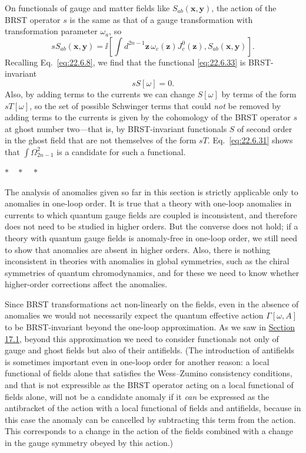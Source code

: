 On functionals of gauge and matter fields like
$S_{ab}(\mathbf x,\mathbf y)$, the action of the BRST operator $s$
is the same as that of a gauge transformation with transformation
parameter $\omega_a$, so
\[
 sS_{ab}(\mathbf x,\mathbf y)
 =\ii\left[
 \int d^{2n-1}\mathbf z\,\omega_c(\mathbf z)J^0_c(\mathbf z),
 S_{ab}(\mathbf x,\mathbf y)
 \right].
\]
Recalling Eq.~\eqref{eq:22.6.8}, we find that the functional
\eqref{eq:22.6.33} is BRST-invariant
\begin{equation}
 sS[\omega]=0.
 \tag{22.6.34}\label{eq:22.6.34}
\end{equation}
Also, by adding terms to the currents we can change $S[\omega]$ by terms
of the form $sT[\omega]$, so the set of possible Schwinger terms that
could \emph{not} be removed by adding terms to the currents is given by
the cohomology of the BRST operator $s$ at ghost number two---that is, by
BRST-invariant functionals $S$ of second order in the ghost field that are
not themselves of the form $sT$. Eq.~\eqref{eq:22.6.31} shows that
$\int\Omega^2_{2n-1}$ is a candidate for such a functional.

\begin{center}
$* \quad * \quad *$
\end{center}

The analysis of anomalies given so far in this section is strictly
applicable only to anomalies in one-loop order. It is true that a theory
with one-loop anomalies in currents to which quantum gauge fields are
coupled is inconsistent, and therefore does not need to be studied in
higher orders. But the converse does not hold; if a theory with quantum
gauge fields is anomaly-free in one-loop order, we still need to show that
anomalies are absent in higher orders. Also, there is nothing inconsistent
in theories with anomalies in global symmetries, such as the chiral
symmetries of quantum chromodynamics, and for these we need to know
whether higher-order corrections affect the anomalies.

Since BRST transformations act non-linearly on the fields, even in the
absence of anomalies we would not necessarily expect the quantum
effective action $\Gamma[\omega,A]$ to be BRST-invariant beyond the
one-loop approximation. As we saw in
\hyperref[sec:17.1]{Section 17.1}, beyond this approximation we need to
consider functionals not only of gauge and ghost fields but also of their
antifields. (The introduction of antifields is sometimes important even in
one-loop order for another reason: a local functional of fields alone that
satisfies the Wess--Zumino consistency conditions, and that is not
expressible as the BRST operator acting on a local functional of fields
alone, will not be a candidate anomaly if it \emph{can} be expressed as the
antibracket of the action with a local functional of fields and antifields,
because in this case the anomaly can be cancelled by subtracting this term
from the action. This corresponds to a change in the action of the fields
combined with a change in the gauge symmetry obeyed by this action.)

